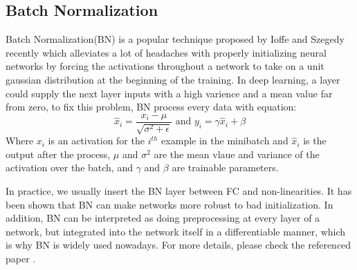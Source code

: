 \subsection{Batch Normalization}
Batch Normalization(BN) is a popular technique proposed by Ioffe and Szegedy \cite{ioffe2015batch} recently 
which alleviates a lot of headaches with properly initializing neural networks by forcing 
the activations throughout a network 
to take on a unit gaussian distribution at the beginning of the training. 
In deep learning, a layer could supply the next layer inputs with a high varience and a mean value far from zero,
to fix this problem, BN process every data with equation:
$$\hat{x}_{i}=\frac{x_{i}-\mu}{\sqrt{\sigma^{2}+\epsilon}} \text { and } y_{i}=\gamma \hat{x}_{i}+\beta$$
Where $x_{i}$ is an activation for the $i^{th}$ example in the minibatch and $\hat{x}_{i}$ is the output after 
the process, $\mu$ and $\sigma^{2}$ are the mean vlaue and variance of the activation over the batch, and
$\gamma$ and $\beta$ are trainable parameters.

In practice, we usually insert the BN layer between FC and non-linearities.
It has been shown that BN can make networks more robust to bad 
initialization. In addition, BN can be interpreted as doing preprocessing at every layer of a network, but 
integrated into the network itself in a differentiable manner, which is why BN is widely used nowadays.
For more details, please check the referenced paper \cite{ioffe2015batch}.

